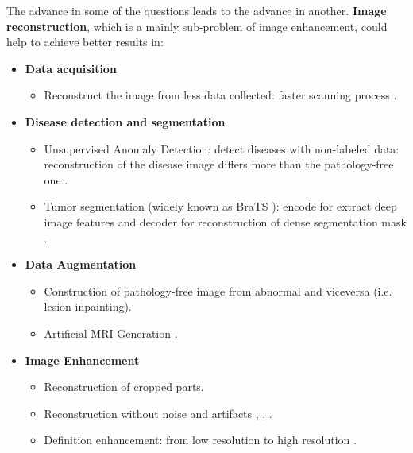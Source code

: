 The advance in some of the questions leads to the advance in another. \textbf{Image reconstruction}, which is a mainly sub-problem of image enhancement, could help to achieve better results in:
\begin{itemize}
    \item \textbf{Data acquisition}
    \begin{itemize}
        \item Reconstruct the image from less data collected: faster scanning process \cite{fastmri}.
    \end{itemize}
    
    \item \textbf{Disease detection and segmentation}
    \begin{itemize}
        \item Unsupervised Anomaly Detection: detect diseases with non-labeled data: reconstruction of the disease image differs more than the pathology-free one \cite{pinaya2019}.
        \item Tumor segmentation (widely known as BraTS \cite{brats2014}): encode for extract deep image features and decoder for reconstruction of dense segmentation mask \cite{myronenko20183d}.
    \end{itemize} 
    
    \item \textbf{Data Augmentation}
    \begin{itemize}
        \item Construction of pathology-free image from abnormal and viceversa \cite{2020inpainting} (i.e. lesion inpainting).
        \item Artificial MRI Generation \cite{GanDataAugment2018}  .
    \end{itemize}
    
    \item \textbf{Image Enhancement}
    \begin{itemize}
        \item Reconstruction of cropped parts.
        \item Reconstruction without noise and artifacts \cite{superresolution} \cite{bermudez2018t1autoencoder}, \cite{gondara2016medicalautoencoder}, \cite{wganautoencoder}.
        \item Definition enhancement: from low resolution to high resolution \cite{ganHR3d} \cite{superresolution}.
    \end{itemize}
\end{itemize} 

